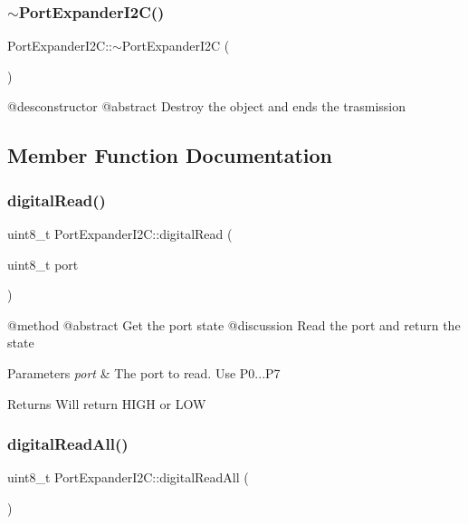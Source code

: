 \subsubsection{\texorpdfstring{$\sim$PortExpanderI2C()}{~PortExpanderI2C()}}
{\footnotesize\ttfamily Port\+Expander\+I2\+C\+::$\sim$\+Port\+Expander\+I2C (\begin{DoxyParamCaption}{ }\end{DoxyParamCaption})}

@desconstructor @abstract Destroy the object and ends the trasmission 

\subsection{Member Function Documentation}
\mbox{\label{classPortExpanderI2C_a514a669283125d213aff4eb4d58f17d9}} 
\subsubsection{\texorpdfstring{digitalRead()}{digitalRead()}}
{\footnotesize\ttfamily uint8\+\_\+t Port\+Expander\+I2\+C\+::digital\+Read (\begin{DoxyParamCaption}\item[{uint8\+\_\+t}]{port }\end{DoxyParamCaption})}

@method @abstract Get the port state @discussion Read the port and return the state 
\begin{DoxyParams}{Parameters}
{\em port} & The port to read. Use P0...P7 \\
\hline
\end{DoxyParams}
\begin{DoxyReturn}{Returns}
Will return H\+I\+GH or L\+OW 
\end{DoxyReturn}
\mbox{\label{classPortExpanderI2C_a460246e95331ace4c1f5f15199098c4c}} 
\subsubsection{\texorpdfstring{digitalReadAll()}{digitalReadAll()}}
{\footnotesize\ttfamily uint8\+\_\+t Port\+Expander\+I2\+C\+::digital\+Read\+All (\begin{DoxyParamCaption}{ }\end{DoxyParamCaption})}

